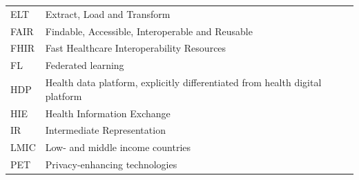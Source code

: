 \documentclass[
  authoryear]{elsarticle}
\begin{document}
\begin{longtable}[]{@{}
  >{\raggedright\arraybackslash}p{}
  >{\raggedright\arraybackslash}p{}@{}}
\toprule\noalign{}
\endhead
\bottomrule\noalign{}
\endlastfoot
ELT & Extract, Load and Transform \\
FAIR & Findable, Accessible, Interoperable and Reusable \\
FHIR & Fast Healthcare Interoperability Resources \\
FL & Federated learning \\
HDP & Health data platform, explicitly differentiated from health
digital platform \\
HIE & Health Information Exchange \\
IR & Intermediate Representation \\
LMIC & Low- and middle income countries \\
PET & Privacy-enhancing technologies \\
\end{longtable}


  
\end{document}
